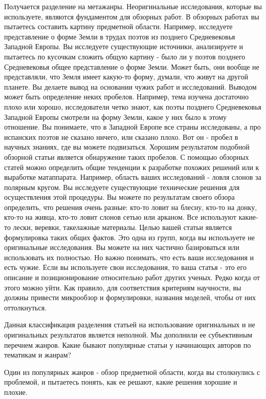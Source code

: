 \documentclass{report}
\begin{document}
Получается разделение на метажанры. 
Неоригинальные исследования, которые вы используете, являются фундаментом для обзорных работ. В обзорных работах вы пытаетесь составить картину предметной области. Например, исследуете представление о форме Земли в трудах поэтов из позднего Средневековья Западной Европы. Вы исследуете существующие источники, анализируете и пытаетесь по кусочкам сложить общую картину - было ли у поэтов позднего Средневековья общее представление о форме Земли. Может быть, они вообще не представляли, что Земля имеет какую-то форму, думали, что живут на другой планете. Вы делаете вывод на основании чужих работ и исследований. Выводом может быть определение неких пробелов. Например, тема изучена достаточно плохо или хорошо, исследователи четко знают, как поэты позднего Средневековья Западной Европы смотрели на форму Земли, какое у них было к этому отношение. Вы понимаете, что в Западной Европе все страны исследованы, а про испанских поэтов не сказано ничего, или сказано плохо. Вот он - пробел в научных знаниях, где вы можете подвизаться. Хорошим результатом подобной обзорной статьи является обнаружение таких пробелов. С помощью обзорных статей можно определить общие тенденции к разработке похожих решений или к выработке матаппарата. Например, область ваших исследований - ловля слонов за полярным кругом. Вы исследуете существующие технические решения для осуществления этой процедуры. Вы можете по результатам своего обзора определить, что решения очень разные: кто-то ловит на блесну, кто-то на донку, кто-то на живца, кто-то ловит слонов сетью или арканом. Все используют какие-то лески, веревки, такелажные материалы. Целью вашей статьи является формулировка таких общих фактов. Это одна из групп, когда вы используете не оригинальные исследования. Вы можете на них частично базироваться или использовать их полностью. Но важно понимать, что есть ваши исследования и есть чужие. Если вы используете свои исследования, то ваша статья - это его описание и позиционирование относительно работ других ученых. Редко когда от этого можно уйти. Как правило, для соответствия критериям научности, вы должны привести микрообзор и формулировки, названия моделей, чтобы от них оттолкнуться. 

Данная классификация разделения статьей на использование оригинальных и не оригинальных результатов является неполной. Мы дополнили ее субъективным перечнем жанров. Какие бывают популярные статьи у начинающих авторов по тематикам и жанрам?

Один из популярных жанров - обзор предметной области, когда вы столкнулись с проблемой, и пытаетесь понять, как ее решают, какие решения хорошие и плохие.
\end{document}
